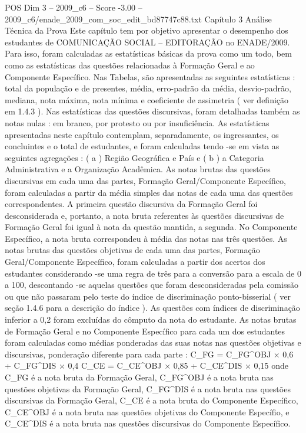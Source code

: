 \begin{textsample}{POS Dim 3 – 2009\_c6 – Score -3.00 – 2009\_c6/enade\_2009\_com\_soc\_edit\_bd87747c88.txt}  \label{ex:f3_pos_243}
Capítulo 3 Análise Técnica da Prova Este capítulo tem por objetivo apresentar o desempenho dos estudantes de COMUNICAÇÃO SOCIAL – EDITORAÇÃO no ENADE/2009.
Para isso, foram calculadas as estatísticas básicas da prova como um todo, bem como as estatísticas das questões relacionadas à Formação Geral e ao Componente Específico.
Nas Tabelas, são apresentadas as seguintes estatísticas : total da população e de presentes, média, erro-padrão da média, desvio-padrão, mediana, nota máxima, nota mínima e coeficiente de assimetria ( ver definição em 1.4.3 ).
Nas estatísticas das questões discursivas, foram detalhadas também as notas nulas : em branco, por protesto ou por insuficiência.
As estatísticas apresentadas neste capítulo contemplam, separadamente, os ingressantes, os concluintes e o total de estudantes, e foram calculadas tendo -se em vista as seguintes agregações : ( a ) Região Geográfica e País e ( b ) a Categoria Administrativa e a Organização Acadêmica.
As notas brutas das questões discursivas em cada uma das partes, Formação Geral/Componente Específico, foram calculadas a partir da média simples das notas de cada uma das questões correspondentes.
A primeira questão discursiva da Formação Geral foi desconsiderada e, portanto, a nota bruta referentes às questões discursivas de Formação Geral foi igual à nota da questão mantida, a segunda.
No Componente Específico, a nota bruta correspondeu à média das notas nas três questões.
As notas brutas das questões objetivas de cada uma das partes, Formação Geral/Componente Específico, foram calculadas a partir dos acertos dos estudantes considerando -se uma regra de três para a conversão para a escala de 0 a 100, descontando -se aquelas questões que foram desconsideradas pela comissão ou que não passaram pelo teste do índice de discriminação ponto-bisserial ( ver seção 1.4.6 para a descrição do índice ).
As questões com índices de discriminação inferior a 0,2 foram excluídas do cômputo da nota do estudante.
As notas brutas de Formação Geral e no Componente Específico para cada um dos estudantes foram calculadas como médias ponderadas das suas notas nas questões objetivas e discursivas, ponderação diferente para cada parte : C\_FG = C\_FG\textasciicircum{}OBJ × 0,6 + C\_FG\textasciicircum{}DIS × 0,4 C\_CE = C\_CE\textasciicircum{}OBJ × 0,85 + C\_CE\textasciicircum{}DIS × 0,15 onde C\_FG é a nota bruta da Formação Geral, C\_FG\textasciicircum{}OBJ é a nota bruta nas questões objetivas da Formação Geral, C\_FG\textasciicircum{}DIS é a nota bruta nas questões discursivas da Formação Geral, C\_CE é a nota bruta do Componente Específico, C\_CE\textasciicircum{}OBJ é a nota bruta nas questões objetivas do Componente Específio, e C\_CE\textasciicircum{}DIS é a nota bruta nas questões discursivas do Componente Específico.

\end{textsample}
